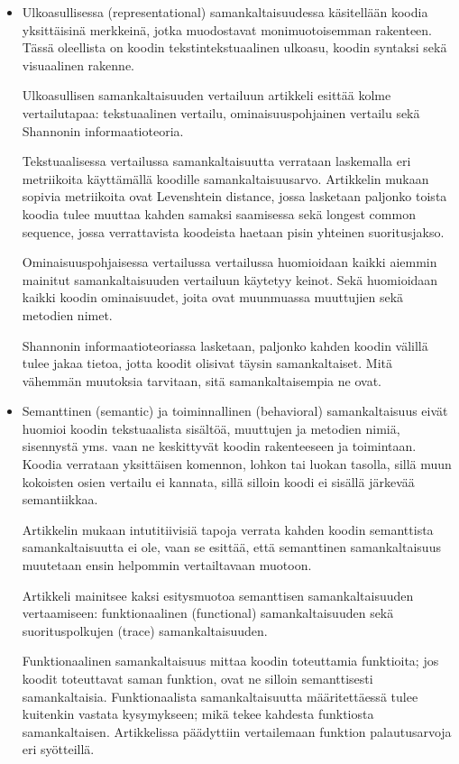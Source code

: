 \documentclass[finnish]{../tktltiki2}
\theoremstyle{definition}
\theoremstyle{remark}
\begin{document}
\begin{itemize}
\item{Ulkoasullisessa (representational)}
samankaltaisuudessa käsitellään koodia yksittäisinä merkkeinä, jotka muodostavat monimuotoisemman rakenteen. Tässä oleellista on koodin tekstintekstuaalinen ulkoasu, koodin syntaksi sekä visuaalinen rakenne.

Ulkoasullisen samankaltaisuuden vertailuun artikkeli esittää kolme vertailutapaa: tekstuaalinen vertailu, ominaisuuspohjainen vertailu sekä Shannonin informaatioteoria.

Tekstuaalisessa vertailussa samankaltaisuutta verrataan laskemalla eri metriikoita käyttämällä koodille samankaltaisuusarvo. Artikkelin mukaan sopivia metriikoita ovat Levenshtein distance, jossa lasketaan paljonko toista koodia tulee muuttaa kahden samaksi saamisessa sekä longest common sequence, jossa verrattavista koodeista haetaan pisin yhteinen suoritusjakso.

Ominaisuuspohjaisessa vertailussa vertailussa huomioidaan kaikki aiemmin mainitut samankaltaisuuden vertailuun käytetyy keinot. Sekä huomioidaan kaikki koodin ominaisuudet, joita ovat muunmuassa muuttujien sekä metodien nimet.

Shannonin informaatioteoriassa lasketaan, paljonko kahden koodin välillä tulee jakaa tietoa, jotta koodit olisivat täysin samankaltaiset. Mitä vähemmän muutoksia tarvitaan, sitä samankaltaisempia ne ovat.

\item{Semanttinen (semantic) ja toiminnallinen (behavioral) }
samankaltaisuus eivät huomioi koodin tekstuaalista sisältöä, muuttujen ja metodien nimiä, sisennystä yms. vaan ne keskittyvät koodin rakenteeseen ja toimintaan. Koodia verrataan yksittäisen komennon, lohkon tai luokan tasolla, sillä muun kokoisten osien vertailu ei kannata, sillä silloin koodi ei sisällä järkevää semantiikkaa.

Artikkelin mukaan intutitiivisiä tapoja verrata kahden koodin semanttista samankaltaisuutta ei ole, vaan se esittää, että semanttinen samankaltaisuus muutetaan ensin helpommin vertailtavaan muotoon.

Artikkeli mainitsee kaksi esitysmuotoa semanttisen samankaltaisuuden vertaamiseen: funktionaalinen (functional) samankaltaisuuden sekä suorituspolkujen (trace) samankaltaisuuden.

Funktionaalinen samankaltaisuus mittaa koodin toteuttamia funktioita; jos koodit toteuttavat saman funktion, ovat ne silloin semanttisesti samankaltaisia.
Funktionaalista samankaltaisuutta määritettäessä tulee kuitenkin vastata kysymykseen; mikä tekee kahdesta funktiosta samankaltaisen. Artikkelissa päädyttiin vertailemaan funktion palautusarvoja eri syötteillä.


\end{itemize}
\end{document}
